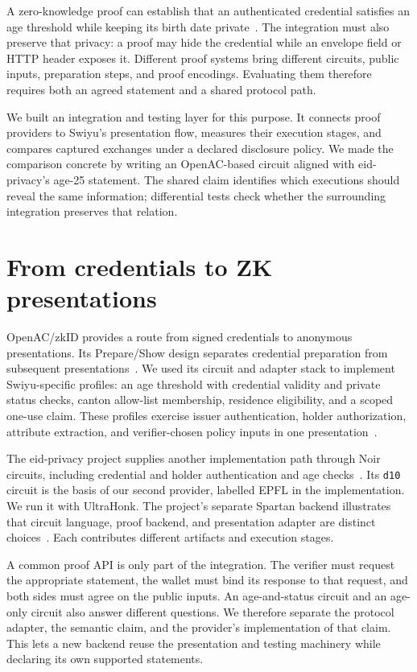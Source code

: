 \documentclass[10pt,twocolumn,letterpaper]{article}
\newcommand{\code}[1]{\texttt{#1}}
\begin{document}
A zero-knowledge proof can establish that an authenticated credential satisfies an age threshold while keeping its birth date private~\cite{goldwasser1989,openac}. The integration must also preserve that privacy: a proof may hide the credential while an envelope field or HTTP header exposes it. Different proof systems bring different circuits, public inputs, preparation steps, and proof encodings. Evaluating them therefore requires both an agreed statement and a shared protocol path.

We built an integration and testing layer for this purpose. It connects proof providers to Swiyu's presentation flow, measures their execution stages, and compares captured exchanges under a declared disclosure policy. We made the comparison concrete by writing an OpenAC-based circuit aligned with eid-privacy's age-25 statement. The shared claim identifies which executions should reveal the same information; differential tests check whether the surrounding integration preserves that relation.

\section{From credentials to ZK presentations}
OpenAC/zkID provides a route from signed credentials to anonymous presentations. Its Prepare/Show design separates credential preparation from subsequent presentations~\cite{openac}. We used its circuit and adapter stack to implement Swiyu-specific profiles: an age threshold with credential validity and private status checks, canton allow-list membership, residence eligibility, and a scoped one-use claim. These profiles exercise issuer authentication, holder authorization, attribute extraction, and verifier-chosen policy inputs in one presentation~\cite{artifact}.

The eid-privacy project supplies another implementation path through Noir circuits, including credential and holder authentication and age checks~\cite{epfl}. Its \code{d10} circuit is the basis of our second provider, labelled EPFL in the implementation. We run it with UltraHonk. The project's separate Spartan backend illustrates that circuit language, proof backend, and presentation adapter are distinct choices~\cite{spartan}. Each contributes different artifacts and execution stages.

A common proof API is only part of the integration. The verifier must request the appropriate statement, the wallet must bind its response to that request, and both sides must agree on the public inputs. An age-and-status circuit and an age-only circuit also answer different questions. We therefore separate the protocol adapter, the semantic claim, and the provider's implementation of that claim. This lets a new backend reuse the presentation and testing machinery while declaring its own supported statements.
\end{document}
